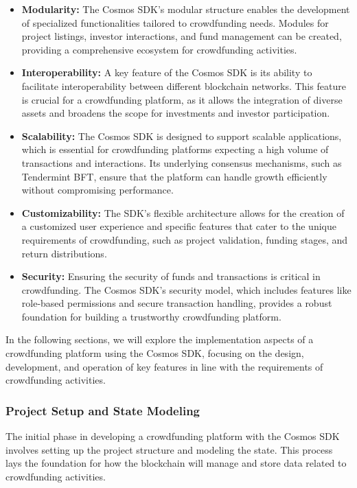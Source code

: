 \begin{itemize}
    \item \textbf{Modularity:} The Cosmos SDK's modular structure enables the development of specialized functionalities tailored to crowdfunding needs. Modules for project listings, investor interactions, and fund management can be created, providing a comprehensive ecosystem for crowdfunding activities.
    \item \textbf{Interoperability:} A key feature of the Cosmos SDK is its ability to facilitate interoperability between different blockchain networks. This feature is crucial for a crowdfunding platform, as it allows the integration of diverse assets and broadens the scope for investments and investor participation.
    \item \textbf{Scalability:} The Cosmos SDK is designed to support scalable applications, which is essential for crowdfunding platforms expecting a high volume of transactions and interactions. Its underlying consensus mechanisms, such as Tendermint BFT, ensure that the platform can handle growth efficiently without compromising performance.
    \item \textbf{Customizability:} The SDK's flexible architecture allows for the creation of a customized user experience and specific features that cater to the unique requirements of crowdfunding, such as project validation, funding stages, and return distributions.
    \item \textbf{Security:} Ensuring the security of funds and transactions is critical in crowdfunding. The Cosmos SDK's security model, which includes features like role-based permissions and secure transaction handling, provides a robust foundation for building a trustworthy crowdfunding platform.
\end{itemize}

In the following sections, we will explore the implementation aspects of a crowdfunding platform using the Cosmos SDK, focusing on the design, development, and operation of key features in line with the requirements of crowdfunding activities.

\subsubsection{Project Setup and State Modeling}
\label{subsubsec:project-setup-and-state-modeling}

The initial phase in developing a crowdfunding platform with the Cosmos SDK involves setting up the project structure and modeling the state. This process lays the foundation for how the blockchain will manage and store data related to crowdfunding activities.

